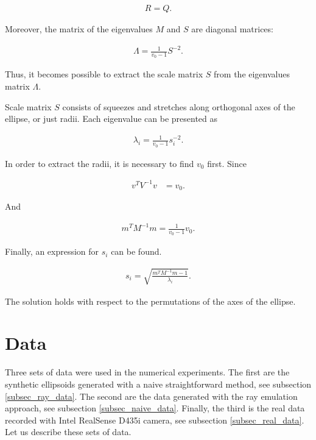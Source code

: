 \begin{align}
  R = Q.
\tag{13}
\end{align}

Moreover, the matrix of the eigenvalues $M$ and $S$ are diagonal matrices:

\begin{align}
  \Lambda  = \frac{1}{v_0-1} S^{-2}.
  \tag{14}
\end{align}

Thus, it becomes possible to extract the scale matrix $S$ from the eigenvalues matrix $\Lambda$.

Scale matrix $S$ consists of squeezes and stretches along orthogonal axes of the ellipse, or just radii. Each eigenvalue can be presented as

\begin{align}
  \lambda_i  = \frac{1}{v_0-1} s_i^{-2}.
\tag{15}
\end{align}

In order to extract the radii, it is necessary to find $v_0$ first.
Since

\begin{align}
   v^TV^{-1}v & = v_0.
\tag{16}
\end{align}

And

\begin{align}
   m^TM^{-1}m = \frac{1}{v_0-1} v_0.
\tag{17}
\end{align}

Finally, an expression for $s_i$ can be found.

\begin{align}
   s_i = \sqrt{\frac{m^TM^{-1}m - 1}{\lambda_i}}.
\tag{18}
\end{align}

The solution holds with respect to the permutations of the axes of the ellipse.

\section{Data}
\label{sec_data}

Three sets of data were used in the numerical experiments.
The first are the synthetic ellipsoids generated with a naive straightforward method, see subsection \ref{subsec_ray_data}.
The second are the data generated with the ray emulation approach, see subsection \ref{subsec_naive_data}.
Finally, the third is the real data recorded with Intel RealSense D435i camera, see subsection \ref{subsec_real_data}.
Let us describe these sets of data.

